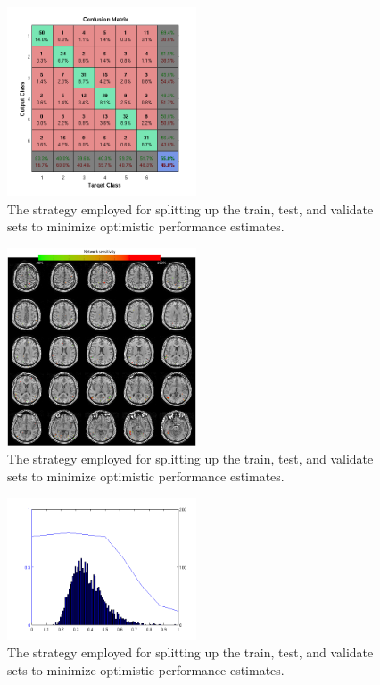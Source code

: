 \documentclass[twocolumn,draft]{article}
\begin{document}
\begin{figure}[!htbp]
\centering
\includegraphics[width=0.5\textwidth]{figures/confusion-average}
\caption{The strategy employed for splitting up the train, test, and validate sets to minimize optimistic performance estimates.}
\label{fig:confusion-average}
\end{figure}

\begin{figure}[!htbp]
\centering
\includegraphics[width=0.5\textwidth]{figures/sensitivity-analysis}
\caption{The strategy employed for splitting up the train, test, and validate sets to minimize optimistic performance estimates.}
\label{fig:sensitivity-analysis}
\end{figure}

\begin{figure}[!htbp]
\centering
\includegraphics[width=0.5\textwidth]{figures/sensitivity-cutoff}
\caption{The strategy employed for splitting up the train, test, and validate sets to minimize optimistic performance estimates.}
\label{fig:sensitivity-cutoff}
\end{figure}
\end{document}
